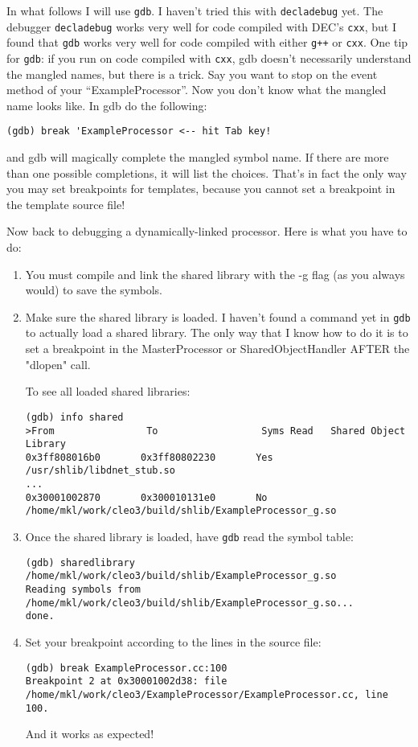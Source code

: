 \documentclass[12pt]{article}
\begin{document}
In what follows I will use \texttt{gdb}. I haven't tried this with
\texttt{decladebug} yet. The debugger \texttt{decladebug} works very
well for code compiled with DEC's \texttt{cxx}, but I found that
\texttt{gdb} works very well for code compiled with either \texttt{g++}
or \texttt{cxx}. One tip for \texttt{gdb}: if you run on code compiled
with \texttt{cxx}, gdb doesn't necessarily understand the mangled names,
but there is a trick. Say you want to stop on the event method of your
``ExampleProcessor''. Now you don't know what the mangled name looks
like. In gdb do the following:
\begin{verbatim}
(gdb) break 'ExampleProcessor <-- hit Tab key!
\end{verbatim}
and gdb will magically complete the mangled symbol name. If there are
more than one possible completions, it will list the choices.
That's in fact the only way you may set breakpoints for templates,
because you cannot set a breakpoint in the template source file!

Now back to debugging a dynamically-linked processor. Here is what you
have to do:
%
\begin{enumerate}

\item You must compile and link the shared library with the -g flag (as you 
always would) to save the symbols.

\item Make sure the shared library is loaded. I haven't found a command
yet in \texttt{gdb} to actually load a shared library. The only way that
I know how to do it is to set a breakpoint in the MasterProcessor or
SharedObjectHandler AFTER the "dlopen" call.

\noindent To see all loaded shared libraries:
%
\begin{verbatim}
(gdb) info shared
>From                To                  Syms Read   Shared Object Library
0x3ff808016b0       0x3ff80802230       Yes         /usr/shlib/libdnet_stub.so
...
0x30001002870       0x300010131e0       No      
/home/mkl/work/cleo3/build/shlib/ExampleProcessor_g.so
\end{verbatim}

\item Once the shared library is loaded, have \texttt{gdb} read the symbol table:
%
\begin{verbatim}
(gdb) sharedlibrary /home/mkl/work/cleo3/build/shlib/ExampleProcessor_g.so
Reading symbols from /home/mkl/work/cleo3/build/shlib/ExampleProcessor_g.so...
done.
\end{verbatim}

\item Set your breakpoint according to the lines in the source file:
%
\begin{verbatim}
(gdb) break ExampleProcessor.cc:100
Breakpoint 2 at 0x30001002d38: file 
/home/mkl/work/cleo3/ExampleProcessor/ExampleProcessor.cc, line 100.
\end{verbatim}

And it works as expected!

\end{enumerate}
\end{document}

